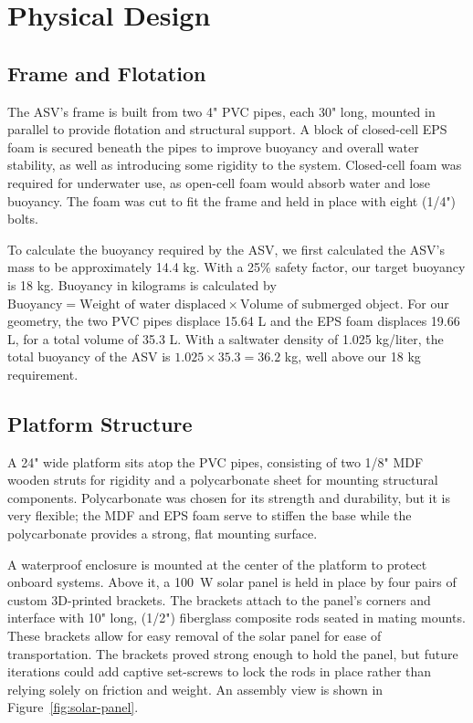 \section{Physical Design}
\subsection{Frame and Flotation}
The ASV's frame is built from two 4" PVC pipes, each 30" long, mounted in parallel to provide flotation and structural support. A block of closed-cell EPS foam is secured beneath the pipes to improve buoyancy and overall water stability, as well as introducing some rigidity to the system. Closed-cell foam was required for underwater use, as open-cell foam would absorb water and lose buoyancy. The foam was cut to fit the frame and held in place with eight (1/4") bolts.

To calculate the buoyancy required by the ASV, we first calculated the ASV's mass to be approximately 14.4 kg. With a 25\% safety factor, our target buoyancy is 18 kg. Buoyancy in kilograms is calculated by \(\text{Buoyancy} = \text{Weight of water displaced} \times \text{Volume of submerged object}\). For our geometry, the two PVC pipes displace 15.64 L and the EPS foam displaces 19.66 L, for a total volume of 35.3 L. With a saltwater density of 1.025 kg/liter, the total buoyancy of the ASV is \(1.025 \times 35.3 = 36.2 \) kg, well above our 18 kg requirement.
\subsection{Platform Structure}
A 24" wide platform sits atop the PVC pipes, consisting of two 1/8" MDF wooden struts for rigidity and a polycarbonate sheet for mounting structural components. Polycarbonate was chosen for its strength and durability, but it is very flexible; the MDF and EPS foam serve to stiffen the base while the polycarbonate provides a strong, flat mounting surface.

A waterproof enclosure is mounted at the center of the platform to protect onboard systems. Above it, a \SI{100}{\watt} solar panel is held in place by four pairs of custom 3D-printed brackets. The brackets attach to the panel's corners and interface with 10" long, (1/2") fiberglass composite rods seated in mating mounts. These brackets allow for easy removal of the solar panel for ease of transportation. The brackets proved strong enough to hold the panel, but future iterations could add captive set-screws to lock the rods in place rather than relying solely on friction and weight. An assembly view is shown in Figure~\ref{fig:solar-panel}.

